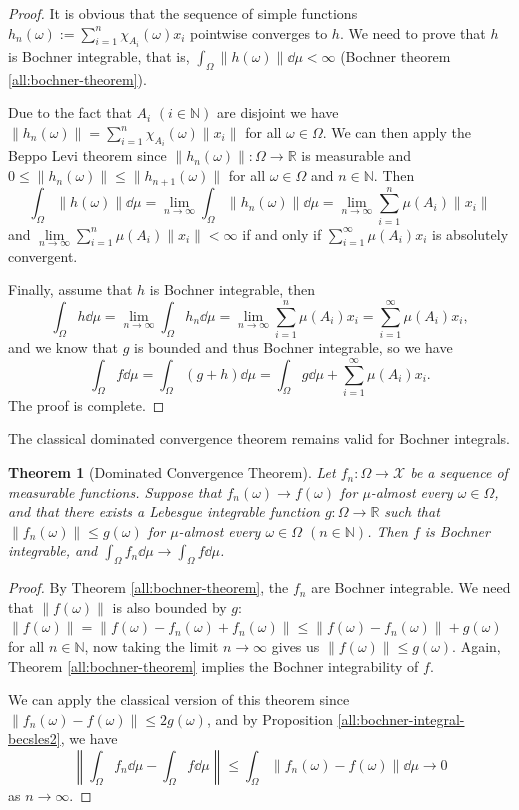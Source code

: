 \documentclass[a4paper, 12pt]{article}
\newtheorem{theo}[lem]{Theorem}
\begin{document}
\begin{proof}
It is obvious that the sequence of simple functions $h_n(\omega) := \sum^{n}_{i=1} \chi_{A_i}(\omega)  x_i$ pointwise converges to $h$. We need to prove that $h$ is Bochner integrable, that is, $\int_{\Omega} \| h(\omega) \| \dd{\mu} < \infty$ (Bochner theorem \ref{all:bochner-theorem}).

Due to the fact that $A_i$ $(i \in \mathbb{N})$ are disjoint we have $\| h_n(\omega) \| = \sum^{n}_{i=1} \chi_{A_i}(\omega) \| x_i \|$ for all $\omega \in \Omega$. We can then apply the Beppo Levi theorem since $\|h_n(\omega)\| \colon \Omega \to \mathbb{R}$ is measurable and $0 \leqslant \|h_n(\omega)\| \leqslant \|h_{n+1}(\omega)\|$ for all $\omega \in \Omega$ and $n \in \mathbb{N}$.
Then
$$
\int_{\Omega} \|h(\omega)\| \dd{\mu}=\lim_{n \to \infty} \int_{\Omega} \|h_n(\omega)\| \dd{\mu} = \lim_{n \to \infty}  \sum^{n}_{i=1} \mu(A_i) \| x_i \|
$$
and $\lim\limits_{n \to \infty}  \sum^{n}_{i=1} \mu(A_i) \| x_i \| < \infty$ if and only if $\sum^{\infty}_{i=1}\mu(A_i) x_i$ is absolutely convergent.

Finally, assume that $h$ is Bochner integrable, then
$$\int_{\Omega} h \dd{\mu} = \lim_{n \to \infty} \int_{\Omega} h_n \dd{\mu} = \lim_{n \to \infty} \sum^{n}_{i = 1} \mu(A_i) x_i = \sum^{\infty}_{i = 1} \mu(A_i) x_i,$$
and we know that $g$ is bounded and thus Bochner integrable, so we have
$$\int_{\Omega} f \dd{\mu} = \int_{\Omega} (g+h) \dd{\mu} = \int_{\Omega} g \dd{\mu} + \sum^{\infty}_{i = 1} \mu(A_i) x_i.$$
The proof is complete.
\end{proof}
The classical dominated convergence theorem remains valid for Bochner integrals.
\begin{theo}[Dominated Convergence Theorem] Let $f_n \colon \Omega \rightarrow \mathcal{X}$ be a sequence of measurable functions. Suppose that $f_n(\omega) \rightarrow f(\omega)$ for $\mu$-almost every $\omega \in \Omega$, and that there exists a Lebesgue integrable function $g \colon \Omega \rightarrow \mathbb{R}$ such that $\| f_n(\omega) \| \leqslant g(\omega)$ for $\mu$-almost every $\omega \in \Omega$ $(n \in \mathbb{N})$. Then $f$ is Bochner integrable, and $\int_{\Omega} f_n \dd{\mu} \rightarrow \int_{\Omega} f \dd{\mu}$.
\end{theo}
\begin{proof} By Theorem \ref{all:bochner-theorem}, the $f_n$ are Bochner integrable. We need that $\| f(\omega) \|$ is also bounded by $g$: $\|f(\omega) \| = \| f(\omega) - f_n(\omega) + f_n(\omega) \| \leqslant \| f(\omega) - f_n(\omega) \| + g(\omega)$ for all $n \in \mathbb{N}$, now taking the limit $n \rightarrow \infty$ gives us $\| f(\omega) \| \leqslant g(\omega)$. Again, Theorem \ref{all:bochner-theorem} implies the Bochner integrability of $f$.

We can apply the classical version of this theorem since $\| f_n(\omega) - f(\omega) \| \leqslant 2g(\omega)$, and by Proposition \ref{all:bochner-integral-becsles2}, we have
$$\left \| \int_{\Omega} f_n \dd{\mu} - \int_{\Omega} f \dd{\mu} \right \| \leqslant \int_{\Omega} \| f_n(\omega) - f(\omega) \| \dd{\mu} \rightarrow 0$$
as $n \rightarrow \infty$.
\end{proof}
\end{document}
